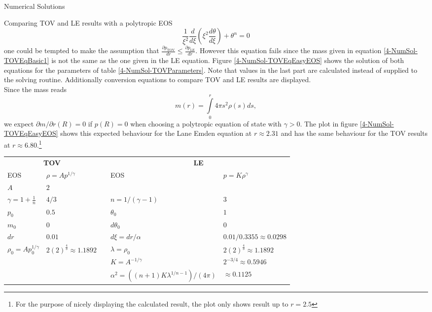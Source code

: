 \begin{section}{Numerical Solutions}
\begin{subsection}{Comparing TOV and LE results with a polytropic EOS}
\begin{equation}
	\frac{1}{\xi^2}\frac{d}{d\xi}\left(\xi^2\frac{d\theta}{d\xi}\right) + \theta^n = 0
	\label{4-Num-Sol-LE}
\end{equation}
one could be tempted to make the assumption that
$\frac{\partial p_{\text{TOV}}}{dr} \leq \frac{\partial p_{\text{LE}}}{dr}.$
However this equation fails since the mass given in equation \ref{4-NumSol-TOVEqBasic1} is not the same as the one given in the LE equation. Figure \ref{4-NumSol-TOVEqEasyEOS} shows the solution of both equations for the parameters of table \ref{4-NumSol-TOVParameters}. Note that values in the last part are calculated instead of supplied to the solving routine. Additionally conversion equations to compare TOV and LE results are displayed.\\
Since the mass reads
\begin{equation}
	m(r) = \int\limits_0^r 4\pi s^2\rho(s)ds,
\end{equation}
we expect $\partial m/\partial r(R)=0$ if $p(R)=0$ when choosing a polytropic equation of state with $\gamma>0$. The plot in figure \ref{4-NumSol-TOVEqEasyEOS} shows this expected behaviour for the Lane Emden equation at $r\approx2.31$ and has the same behaviour for the TOV results at $r\approx6.80$.\footnote{For the purpose of nicely displaying the calculated result, the plot only shows result up to $r=2.5$}
\begin{table}[H]
	\renewcommand{\arraystretch}{1.2}
	\centering
	\begin{tabular}{@{}llcll@{}}
		\toprule
		\multicolumn{2}{c}{\textbf{TOV}} & \phantom{abc} &\multicolumn{2}{c}{\textbf{LE}}\\
		\cmidrule{1-2} \cmidrule{4-5}
		EOS & $\rho=Ap^{1/\gamma}$ && EOS & $p=K\rho^{\gamma}$\\
		$A$ & $2$ & & \\
		$\gamma=1+\frac{1}{n}$ & $4/3$ && $n=1/(\gamma-1)$ & $3$\\
		$p_0$ & $0.5$ && $\theta_0$ & $1$\\
		$m_0$ & $0$ && $d\theta_0$ & $0$\\
		$dr$ & $0.01$ && $d\xi=dr/\alpha$ & $0.01/0.3355\approx0.0298$\\
		\cmidrule{1-2} \cmidrule{4-5}
		$\rho_0=Ap_0^{1/\gamma}$ & $2(2)^{\frac{4}{3}}\approx1.1892$ && $\lambda=\rho_0$ & $2(2)^{\frac{4}{3}}\approx1.1892$\\
		&&& $K=A^{-1/\gamma}$ & $2^{-3/4}\approx0.5946$\\
		&&& $\alpha^2=((n+1)K\lambda^{1/n-1})/(4\pi)$ & $\approx0.1125$\\

\end{tabular}
\end{table}
\end{subsection}
\end{section}
